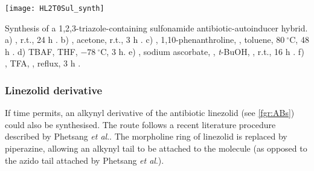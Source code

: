 \begin{scheme}[H]
	\begin{center}
		\texttt{[image: HL2T0Sul\_synth]}
		\caption{Synthesis of a 1,2,3-triazole-containing sulfonamide antibiotic-autoinducer hybrid.
		a) , r.t., 24 h \cite{Bendikov2005}. 
		b) , acetone, r.t., 3 h \cite{Graux2014}. 
		c) , 1,10-phenanthroline, , toluene, $80\ ^{\circ}$C, 48 h \cite{Graux2014}. 
		d) TBAF, THF, $-78\ ^{\circ}$C, 3 h\cite{Graux2014}. 
		e) , sodium ascorbate, , \textit{t}-BuOH, , r.t., 16 h \cite{IJsselstijn2006}. 
		f) , TFA, , reflux, 3 h \cite{Bissinger2011, Reuillon2012}.
		\label{sch:HL2T0Sul_synth}}
	\end{center}
\end{scheme}


\subsubsection{Linezolid derivative}

If time permits, an alkynyl derivative of the antibiotic linezolid  (see \ref{fgr:ABs}) could also be synthesised. The route follows a recent literature procedure described by Phetsang \textit{et al}.\cite{Phetsang2014}. The morpholine ring of linezolid is replaced by piperazine, allowing an alkynyl tail to be attached to the molecule (as opposed to the azido tail attached by Phetsang \textit{et al}.).




